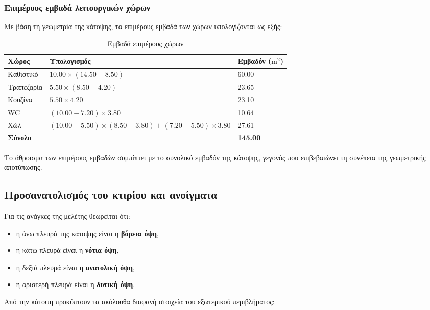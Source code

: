 \documentclass[12pt,a4paper]{article}
\begin{document}
\subsubsection{Επιμέρους εμβαδά λειτουργικών χώρων}

Με βάση τη γεωμετρία της κάτοψης, τα επιμέρους εμβαδά των χώρων υπολογίζονται ως εξής:

\begin{table}[H]
\centering
\small
\caption{Εμβαδά επιμέρους χώρων}
\begin{tabularx}{\textwidth}{L L C{2.8cm}}
\toprule
\textbf{Χώρος} & \textbf{Υπολογισμός} & \textbf{Εμβαδόν (\(\mathrm{m^2}\))} \\
\midrule
Καθιστικό & \(10.00 \times (14.50 - 8.50)\) & 60.00 \\
Τραπεζαρία & \(5.50 \times (8.50 - 4.20)\) & 23.65 \\
Κουζίνα & \(5.50 \times 4.20\) & 23.10 \\
WC & \((10.00 - 7.20) \times 3.80\) & 10.64 \\
Χώλ & \((10.00 - 5.50)\times(8.50 - 3.80) + (7.20 - 5.50)\times 3.80\) & 27.61 \\
\midrule
\textbf{Σύνολο} &  & \textbf{145.00} \\
\bottomrule
\end{tabularx}
\end{table}

Το άθροισμα των επιμέρους εμβαδών συμπίπτει με το συνολικό εμβαδόν της κάτοψης,
γεγονός που επιβεβαιώνει τη συνέπεια της γεωμετρικής αποτύπωσης.

\subsection{Προσανατολισμός του κτιρίου και ανοίγματα}

Για τις ανάγκες της μελέτης θεωρείται ότι:

\begin{itemize}
\item η άνω πλευρά της κάτοψης είναι η \textbf{βόρεια όψη},
\item η κάτω πλευρά είναι η \textbf{νότια όψη},
\item η δεξιά πλευρά είναι η \textbf{ανατολική όψη},
\item η αριστερή πλευρά είναι η \textbf{δυτική όψη}.
\end{itemize}

Από την κάτοψη προκύπτουν τα ακόλουθα διαφανή στοιχεία του εξωτερικού περιβλήματος:
\end{document}
